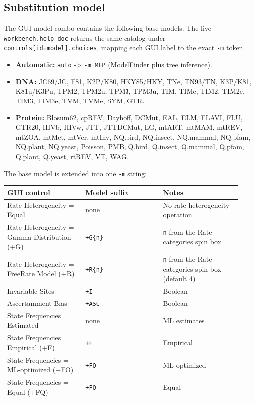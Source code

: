 \documentclass[11pt]{report}
\begin{document}
\subsection{Substitution model}

The GUI model combo contains the following base models. The live \texttt{workbench.\allowbreak help\_\allowbreak doc} returns the same catalog under \texttt{controls[id=model].\allowbreak choices}, mapping each GUI label to the exact \texttt{-m} token.

\begin{itemize}
  \item \textbf{Automatic:} \texttt{auto} -> \texttt{-m MFP} (ModelFinder plus tree inference).
  \item \textbf{DNA:} JC69/JC, F81, K2P/K80, HKY85/HKY, TNe, TN93/TN, K3P/K81, K81u/K3Pu, TPM2, TPM2u, TPM3, TPM3u, TIM, TIMe, TIM2, TIM2e, TIM3, TIM3e, TVM, TVMe, SYM, GTR.
  \item \textbf{Protein:} Blosum62, cpREV, Dayhoff, DCMut, EAL, ELM, FLAVI, FLU, GTR20, HIVb, HIVw, JTT, JTTDCMut, LG, mtART, mtMAM, mtREV, mtZOA, mtMet, mtVer, mtInv, NQ.bird, NQ.insect, NQ.mammal, NQ.pfam, NQ.plant, NQ.yeast, Poisson, PMB, Q.bird, Q.insect, Q.mammal, Q.pfam, Q.plant, Q.yeast, rtREV, VT, WAG.
\end{itemize}

The base model is extended into one \texttt{-m} string:

{\footnotesize
\begin{longtable}{@{}>{\raggedright\arraybackslash}p{0.31\linewidth}>{\raggedright\arraybackslash}p{0.31\linewidth}>{\raggedright\arraybackslash}p{0.31\linewidth}@{}}
\toprule
GUI control & Model suffix & Notes \\
\midrule
\endhead
Rate Heterogeneity = Equal & none & No rate-heterogeneity operation \\
Rate Heterogeneity = Gamma Distribution (+G) & \texttt{+G\{n\}} & \texttt{n} from the Rate categories spin box \\
Rate Heterogeneity = FreeRate Model (+R) & \texttt{+R\{n\}} & \texttt{n} from the Rate categories spin box (default 4) \\
Invariable Sites & \texttt{+I} & Boolean \\
Ascertainment Bias & \texttt{+ASC} & Boolean \\
State Frequencies = Estimated & none & ML estimates \\
State Frequencies = Empirical (+F) & \texttt{+F} & Empirical \\
State Frequencies = ML-optimized (+FO) & \texttt{+FO} & ML-optimized \\
State Frequencies = Equal (+FQ) & \texttt{+FQ} & Equal \\
\bottomrule
\end{longtable}
}
\end{document}
